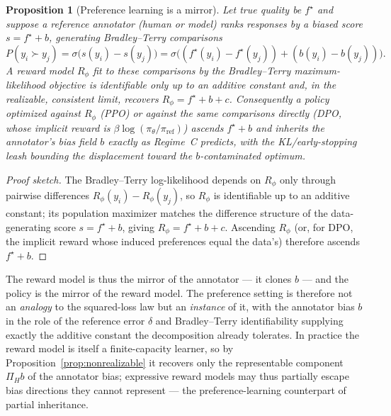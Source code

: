\documentclass[10pt]{article} %
\theoremstyle{plain}
\newtheorem{proposition}{Proposition}
\theoremstyle{remark}
\newcommand{\fstar}{f^{\star}}
\begin{document}
\begin{proposition}[Preference learning is a mirror]
\label{prop:preference}
Let true quality be $\fstar$ and suppose a reference annotator (human or model) ranks responses by a biased score $s=\fstar+b$, generating Bradley--Terry comparisons
\[
P(y_i\succ y_j)=\sigma\!\big(s(y_i)-s(y_j)\big)=\sigma\!\big((\fstar(y_i)-\fstar(y_j))+(b(y_i)-b(y_j))\big).
\]
A reward model $R_\phi$ fit to these comparisons by the Bradley--Terry maximum-likelihood objective is identifiable only up to an additive constant and, in the realizable, consistent limit, recovers $R_\phi=\fstar+b+c$. Consequently a policy optimized against $R_\phi$ (PPO) or against the same comparisons directly (DPO, whose implicit reward is $\beta\log(\pi_\theta/\pi_\mathrm{ref})$) ascends $\fstar+b$ and inherits the annotator's bias field $b$ exactly as Regime~C predicts, with the KL/early-stopping leash bounding the displacement toward the $b$-contaminated optimum.
\end{proposition}
\begin{proof}[Proof sketch]
The Bradley--Terry log-likelihood depends on $R_\phi$ only through pairwise differences $R_\phi(y_i)-R_\phi(y_j)$, so $R_\phi$ is identifiable up to an additive constant; its population maximizer matches the difference structure of the data-generating score $s=\fstar+b$, giving $R_\phi=\fstar+b+c$. Ascending $R_\phi$ (or, for DPO, the implicit reward whose induced preferences equal the data's) therefore ascends $\fstar+b$.
\end{proof}

\noindent The reward model is thus the mirror of the annotator --- it clones $b$ --- and the policy is the mirror of the reward model. The preference setting is therefore not an \emph{analogy} to the squared-loss law but an \emph{instance} of it, with the annotator bias $b$ in the role of the reference error $\delta$ and Bradley--Terry identifiability supplying exactly the additive constant the decomposition already tolerates. In practice the reward model is itself a finite-capacity learner, so by Proposition~\ref{prop:nonrealizable} it recovers only the representable component $\Pi_H b$ of the annotator bias; expressive reward models may thus partially escape bias directions they cannot represent --- the preference-learning counterpart of partial inheritance.
\end{document}
